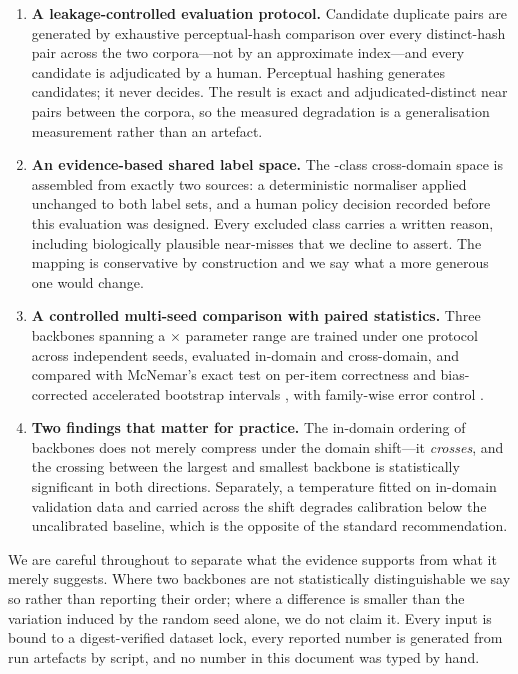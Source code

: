\documentclass[runningheads]{llncs}
\begin{document}
\begin{enumerate}
\item \textbf{A leakage-controlled evaluation protocol.} Candidate duplicate
pairs are generated by exhaustive perceptual-hash comparison over every
distinct-hash pair across the two corpora---not by an approximate index---and
every candidate is adjudicated by a human. Perceptual hashing generates
candidates; it never decides. The result is \NLeakExactCore{} exact and
\NLeakNearCore{} adjudicated-distinct near pairs between the corpora, so the
measured degradation is a generalisation measurement rather than an artefact.

\item \textbf{An evidence-based shared label space.} The
\NSharedClasses{}-class cross-domain space is assembled from exactly two
sources: a deterministic normaliser applied unchanged to both label sets, and a
human policy decision recorded before this evaluation was designed. Every
excluded class carries a written reason, including biologically plausible
near-misses that we decline to assert. The mapping is conservative by
construction and we say what a more generous one would change.

\item \textbf{A controlled multi-seed comparison with paired statistics.} Three
backbones spanning a \ParamRatio{}$\times$ parameter range are trained under one protocol
across independent seeds, evaluated in-domain and cross-domain, and compared
with McNemar's exact test on per-item correctness \cite{mcnemar1947,dietterich1998tests}
and bias-corrected accelerated bootstrap intervals \cite{efron1987bca}, with
family-wise error control \cite{holm1979}.

\item \textbf{Two findings that matter for practice.} The in-domain ordering of
backbones does not merely compress under the domain shift---it \emph{crosses},
and the crossing between the largest and smallest backbone is statistically
significant in both directions. Separately, a temperature fitted on in-domain
validation data and carried across the shift degrades calibration below the
uncalibrated baseline, which is the opposite of the standard recommendation.
\end{enumerate}

We are careful throughout to separate what the evidence supports from what it
merely suggests. Where two backbones are not statistically distinguishable we
say so rather than reporting their order; where a difference is smaller than the
variation induced by the random seed alone, we do not claim it. Every input is
bound to a digest-verified dataset lock, every reported number is generated from
run artefacts by script, and no number in this document was typed by hand.
\end{document}
